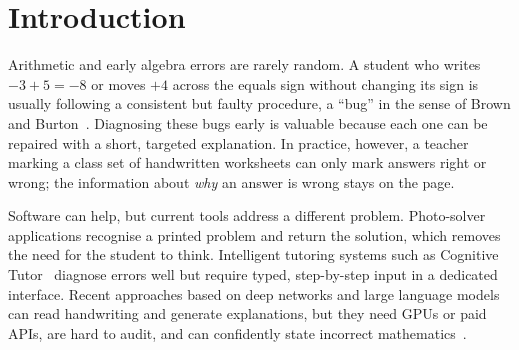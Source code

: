 \documentclass[runningheads]{llncs}
\begin{document}
\section{Introduction}

Arithmetic and early algebra errors are rarely random. A student who writes $-3+5=-8$ or moves $+4$ across the equals sign without changing its sign is usually following a consistent but faulty procedure, a ``bug'' in the sense of Brown and Burton~\cite{brown1978}. Diagnosing these bugs early is valuable because each one can be repaired with a short, targeted explanation. In practice, however, a teacher marking a class set of handwritten worksheets can only mark answers right or wrong; the information about \emph{why} an answer is wrong stays on the page.

Software can help, but current tools address a different problem. Photo-solver applications recognise a printed problem and return the solution, which removes the need for the student to think. Intelligent tutoring systems such as Cognitive Tutor~\cite{koedinger1997} diagnose errors well but require typed, step-by-step input in a dedicated interface. Recent approaches based on deep networks and large language models can read handwriting and generate explanations, but they need GPUs or paid APIs, are hard to audit, and can confidently state incorrect mathematics~\cite{song2026scratchmath}.
\end{document}
